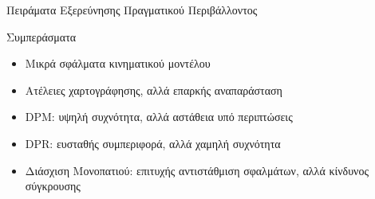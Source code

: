 \documentclass[10pt, compress, handout]{beamer} %
\begin{document}
\begin{frame}{Πειράματα Εξερεύνησης Πραγματικού Περιβάλλοντος}
	\begin{figure}
      \captionsetup[subfigure]{labelformat=empty,position=top}
		\hspace{0.05\linewidth}
	\end{figure}	

	\begin{table}[!ht]
		\centering
	\end{table}
\end{frame}

\begin{frame}{Συμπεράσματα}
	\begin{itemize}
		\item Μικρά σφάλματα κινηματικού μοντέλου
		\item Ατέλειες χαρτογράφησης, αλλά επαρκής αναπαράσταση
		\item DPM: υψηλή συχνότητα, αλλά αστάθεια υπό περιπτώσεις
		\item DPR: ευσταθής συμπεριφορά, αλλά χαμηλή συχνότητα
		\item Διάσχιση Μονοπατιού: επιτυχής αντιστάθμιση σφαλμάτων, αλλά κίνδυνος σύγκρουσης
	\end{itemize}
\end{frame}
\end{document}
